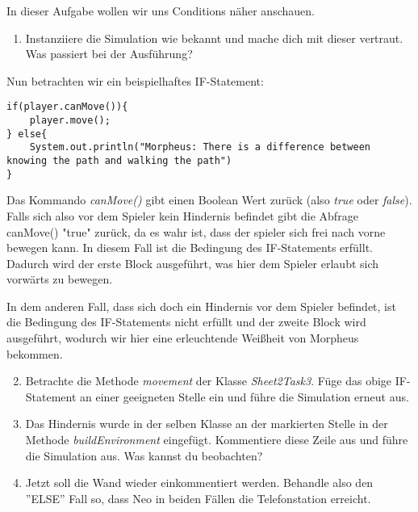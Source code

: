 In dieser Aufgabe wollen wir uns Conditions näher anschauen.
\begin{enumerate}[label=\alph*)]                           
    \item Instanziiere die Simulation wie bekannt und mache dich mit dieser vertraut.
    Was passiert bei der Ausführung?
\end{enumerate}

\begin{Infobox}[IF-Condition]
    Nun betrachten wir ein beispielhaftes IF-Statement:
    \begin{lstlisting}[breaklines=true, numbers=none]
if(player.canMove()){
    player.move();
} else{
    System.out.println("Morpheus: There is a difference between knowing the path and walking the path")
}
    \end{lstlisting}
    Das Kommando \textit{canMove()} gibt einen Boolean Wert zurück (also \textit{true} oder \textit{false}).
    Falls sich also vor dem Spieler kein Hindernis befindet gibt die Abfrage canMove() "true" zurück, da es wahr ist, dass der spieler sich frei nach vorne bewegen kann.
   In diesem Fall ist die Bedingung des IF-Statements erfüllt. Dadurch wird der erste Block
    ausgeführt, was hier dem Spieler erlaubt sich vorwärts zu bewegen.\par 
    In dem anderen Fall, dass sich doch ein Hindernis vor dem Spieler befindet, ist die Bedingung des IF-Statements nicht erfüllt und 
    der zweite Block wird ausgeführt, wodurch wir hier eine erleuchtende Weißheit von Morpheus bekommen.
\end{Infobox}
\begin{enumerate}[label=\alph*)] \setcounter{enumi}{1}
    \item Betrachte die Methode \textit{movement} der Klasse \textit{Sheet2Task3}. Füge das obige IF-Statement an einer geeigneten Stelle ein 
    und führe die Simulation erneut aus.
    \item Das Hindernis wurde in der selben Klasse an der markierten Stelle in der Methode \textit{buildEnvironment} eingefügt.
    Kommentiere diese Zeile aus und führe die Simulation aus. Was kannst du beobachten?
    \item Jetzt soll die Wand wieder einkommentiert werden. Behandle also den ''ELSE'' Fall so, dass Neo in beiden Fällen die Telefonstation erreicht.

\end{enumerate}
